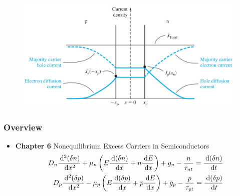 \documentclass{beamer}
\begin{document}
\begin{frame}
\begin{itemize}
\begin{minipage}{\linewidth}
                \begin{minipage}{0.49\linewidth}
                    \begin{figure}[H]
                        \centering
                        \includegraphics[width=\linewidth]{C8-overview-2.jpg}
                        \label{fig:C8-overview-2.jpg}
                    \end{figure}
                \end{minipage}
            \end{minipage}
        \end{itemize}
    \end{frame}
    \begin{frame} \frametitle{Overview}
        \begin{itemize}
            \item \textbf{Chapter 6} Nonequilibrium Excess Carriers in Semiconductors
                \begin{equation*}
                    \begin{aligned}
                        D_n \frac{\: \mathrm{d}^2 (\delta n)}{\: \mathrm{d} x^2} + \mu_n \left( E \frac{\: \mathrm{d} (\delta n)}{\: \mathrm{d} x} + n \frac{\: \mathrm{d} E}{\: \mathrm{d} x}  \right) + g_n - \frac{n}{\tau_{nt}} = \frac{\: \mathrm{d} (\delta n)}{\: \mathrm{d} t} \\
                        D_p \frac{\: \mathrm{d}^2 (\delta p)}{\: \mathrm{d} x^2} - \mu_p \left( E \frac{\: \mathrm{d} (\delta p)}{\: \mathrm{d} x} + p \frac{\: \mathrm{d} E}{\: \mathrm{d} x}  \right) + g_p - \frac{p}{\tau_{pt}} = \frac{\: \mathrm{d} (\delta p)}{\: \mathrm{d} t} \\
                    \end{aligned}
                \end{equation*}
        \end{itemize}
    \end{frame}
\end{document}
